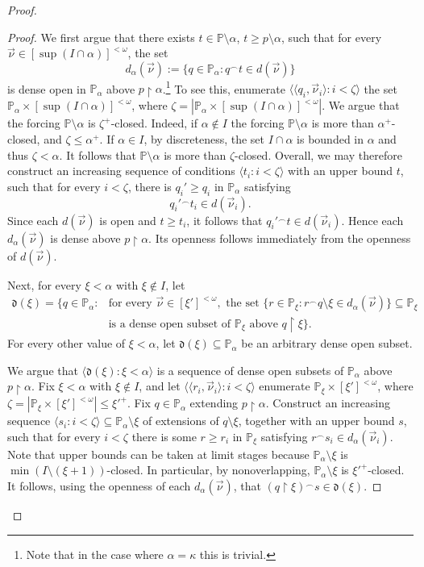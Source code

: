 \documentclass[10pt,a4paper]{amsart}
\newcommand{\la}{\langle}
\newcommand{\po}{\mathbb{P}}
\newcommand{\ra}{\rangle}
\newcommand{\uhr}{\upharpoonright}
\begin{document}
\begin{proof}
\begin{proof}
     We first argue that there exists $t\in \po\setminus\alpha$, $t\geq p\setminus\alpha$, such that for every $\vec{\nu}\in[\sup(I\cap \alpha)]^{<\omega}$, the set
$$d_\alpha(\vec{\nu}):=\{q\in\po_\alpha\colon q{}^\frown t\in d(\vec{\nu})\}$$
is dense open in $\po_\alpha$ above $p\uhr\alpha$.\footnote{Note that in the case where $\alpha = \kappa$ this is trivial.} To see this, enumerate $\langle\langle q_i,\vec{\nu}_i\rangle\colon i<\zeta\rangle$ the set $\po_\alpha\times[\sup(I\cap \alpha)]^{<\omega}$, where $\zeta  = \left|\po_\alpha\times[\sup(I\cap \alpha)]^{<\omega} \right|$. We argue that the forcing $\po\setminus\alpha$ is  $\zeta^+$-closed. Indeed, if $\alpha\notin I$ the forcing $\po\setminus \alpha$ is more than $\alpha^+$-closed, and $\zeta\leq \alpha^+$. If $\alpha\in I$, by discreteness, the set $I\cap \alpha$ is bounded in $\alpha$ and thus $\zeta<\alpha$. It follows that $\po\setminus \alpha$ is more than $\zeta$-closed. Overall, we may therefore construct an increasing sequence of conditions $\langle t_i\colon i<\zeta\rangle$ with an upper bound $t$, such that for every $i<\zeta$, there is $q_i'\geq q_i$ in $\po_\alpha$ satisfying
$$q_i'{}^\frown t_i\in d(\vec{\nu}_i).$$
Since each $d(\vec{\nu})$ is open and $t\geq t_i$, it follows that
$q_i'{}^\frown t\in d(\vec{\nu}_i)$. Hence each $d_\alpha(\vec{\nu})$ is dense above $p\uhr\alpha$. Its openness follows immediately from the openness of $d(\vec{\nu})$.
        
        Next, for every $\xi<\alpha$ with  $\xi\notin I$, let
        \begin{align*}
             \mathfrak{d}(\xi) = \{ q\in \po_\alpha \colon &\text{for every } \vec{\nu}\in [\xi']^{<\omega},\text{ the set }  \{ r\in \po_\xi \colon r{}^\frown q\setminus \xi{} \in d_\alpha(\vec{\nu}) \}\subseteq \po_{\xi} \\
             &\text{is a dense open subset of }\po_\xi \text{ above }q\uhr \xi\}. 
        \end{align*}
        For every other value of $\xi<\alpha$, let $\mathfrak{d}(\xi)\subseteq \po_\alpha$ be an arbitrary dense open subset.
        
        We argue that $\la \mathfrak{d}(\xi)\colon \xi<\alpha\ra$ is a sequence of dense open subsets of $\po_\alpha$ above $p\uhr\alpha$. Fix $\xi<\alpha$ with $\xi \notin I$, and let $\langle\la r_i,\vec{\nu}_i\rangle\colon i<\zeta\ra$ enumerate $\po_\xi\times[\xi']^{<\omega}$, where $\zeta=|\po_\xi\times [\xi']^{<\omega}|\leq {\xi'}^+$. Fix $q\in\po_\alpha$ extending $p\uhr\alpha$. Construct an increasing sequence $\langle s_i\colon i<\zeta\rangle\subseteq\po_\alpha\setminus\xi$ of extensions of $q\setminus\xi$, together with an upper bound $s$, such that for every $i<\zeta$ there is some $r\geq r_i$ in $\po_\xi$ satisfying $r{}^\frown s_i\in d_\alpha(\vec{\nu}_i)$. Note that upper bounds can be taken at limit stages because $\po_\alpha\setminus\xi$ is $\min(I\setminus (\xi+1))$-closed. In particular, by nonoverlapping, $\po_\alpha\setminus \xi$ is ${\xi'}^+$-closed. It follows, using the openness of each $d_\alpha(\vec{\nu})$, that
        $(q\uhr\xi){}^\frown s\in\mathfrak d(\xi)$.
        

\end{proof}
\end{proof}
\end{document}
